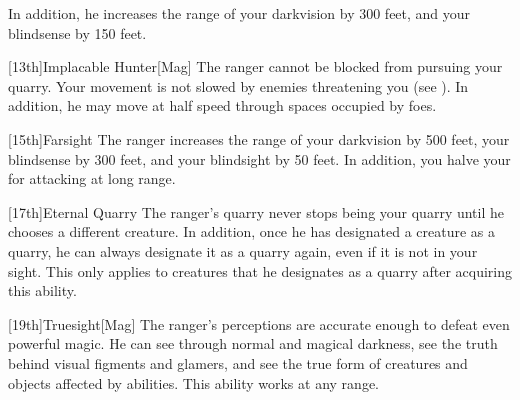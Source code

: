         In addition, he increases the range of your darkvision by 300 feet, and your blindsense by 150 feet.

        [13th]{Implacable Hunter}[Mag]
        The ranger cannot be blocked from pursuing your quarry.
        Your movement is not slowed by enemies threatening you (see ).
        In addition, he may move at half speed through spaces occupied by foes.

        [15th]{Farsight}
        The ranger increases the range of your darkvision by 500 feet, your blindsense by 300 feet, and your blindsight by 50 feet.
        In addition, you halve your  for attacking at long range.

        [17th]{Eternal Quarry}
        The ranger's quarry never stops being your quarry until he chooses a different creature.
        In addition, once he has designated a creature as a quarry, he can always designate it as a quarry again, even if it is not in your sight.
        This only applies to creatures that he designates as a quarry after acquiring this ability.

        [19th]{Truesight}[Mag]
        The ranger's perceptions are accurate enough to defeat even powerful magic.
        He can see through normal and magical darkness, see the truth behind visual figments and glamers, and see the true form of creatures and objects affected by  abilities.
        This ability works at any range.

